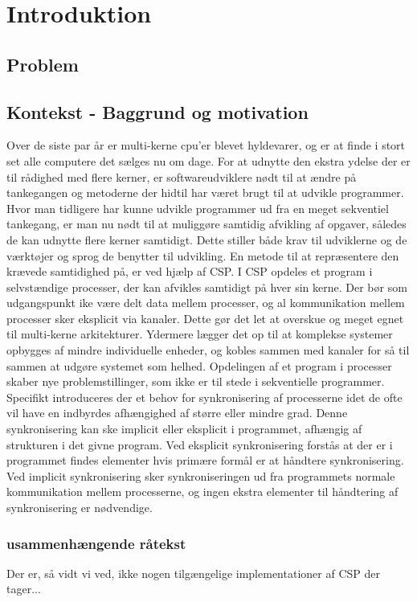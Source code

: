 \chapter{Introduktion}
  \section{Problem}	 
  \section{Kontekst - Baggrund og motivation}
Over de siste par år er multi-kerne cpu'er blevet hyldevarer, og er at finde i 
stort set alle computere det sælges nu om dage. For at udnytte den ekstra 
ydelse der er til rådighed med flere kerner, er softwareudviklere nødt til at 
ændre på tankegangen og metoderne der hidtil har været brugt til at udvikle 
programmer. Hvor man tidligere har kunne udvikle programmer ud fra en meget 
sekventiel tankegang, er man nu nødt til at muliggøre samtidig afvikling af 
opgaver, således de kan udnytte flere kerner samtidigt. Dette stiller både krav 
til udviklerne og de værktøjer og sprog de benytter til udvikling.  En metode 
til at repræsentere den krævede samtidighed på, er ved hjælp af 
CSP\cite{hoare-csp}. I CSP opdeles et program i selvstændige processer, der 
kan afvikles samtidigt på hver sin kerne. Der bør som udgangspunkt ike være 
delt data mellem processer, og al kommunikation mellem processer sker eksplicit 
via kanaler. Dette gør det let at overskue og meget egnet til multi-kerne 
arkitekturer. Ydermere lægger det op til at komplekse systemer opbygges af 
mindre individuelle enheder, og kobles sammen med kanaler for så til sammen at 
udgøre systemet som helhed.
Opdelingen af et program i processer skaber nye problemstillinger, som ikke er 
til stede i sekventielle programmer. Specifikt introduceres der et behov for 
synkronisering af processerne idet de ofte vil have en indbyrdes afhængighed af 
større eller mindre grad. Denne synkronisering kan ske implicit eller eksplicit 
i programmet, afhængig af strukturen i det givne program. Ved eksplicit 
synkronisering forstås at der er i programmet findes elementer hvis primære 
formål er at håndtere synkronisering. Ved implicit synkronisering sker 
synkroniseringen ud fra programmets normale kommunikation mellem processerne, 
og ingen ekstra elementer til håndtering af synkronisering er nødvendige.  

\subsection{usammenhængende råtekst}
Der er, så vidt vi ved, ikke nogen tilgængelige implementationer af CSP der 
tager... 

